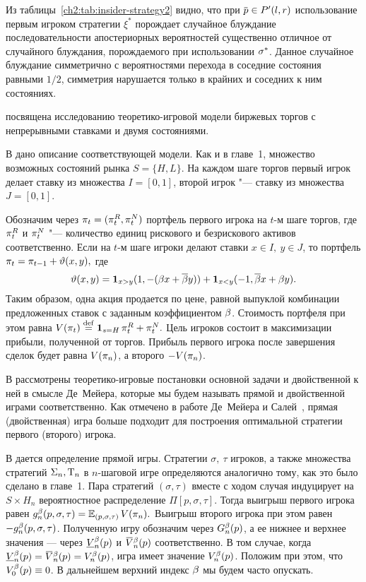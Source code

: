 Из таблицы~\ref{ch2:tab:insider-strategy2} видно, что при $\p \in P'(l, r)$ использование первым игроком стратегии $\xi^*$ порождает случайное блуждание последовательности апостериорных вероятностей существенно отличное от случайного блуждания, порождаемого при использовании $\sigma^*$.
Данное случайное блуждание симметрично с вероятностями перехода в соседние состояния равными $1/2$, симметрия нарушается только в крайних и соседних к ним состояниях.

 посвящена исследованию теоретико-игровой модели биржевых торгов с непрерывными ставками и двумя состояниями. 

В  дано описание соответствующей модели.
Как и в главе~1, множество возможных состояний рынка $S = \{H, L\}$.
На каждом шаге торгов первый игрок делает ставку из множества $I = [0, 1]$, второй игрок "--- ставку из множества $J = [0, 1]$.

Обозначим через $\pi_{t} = (\pi_{t}^R, \pi_{t}^N)$ портфель первого игрока на $t$-м шаге торгов, где $\pi_{t}^R$ и $\pi_{t}^N$ "--- количество единиц рискового и безрискового активов соответственно.
Если на $t$-м шаге игроки делают ставки $x \in I,\ y \in J$, то портфель 
$
\pi_{t} = \pi_{t-1} + \vartheta(x, y),
$
где
\begin{equation}\label{ch3:eq:trans-mech}
  \vartheta(x, y) = \mathbf{1}_{x > y} (1, -(\beta x + {{\overline{\beta}}} y)) +
  \mathbf{1}_{x < y} (-1, {{\overline{\beta}}} x + \beta y).
\end{equation}
Таким образом, одна акция продается по цене, равной выпуклой комбинации предложенных ставок с заданным коэффициентом $\beta$.
Стоимость портфеля при этом равна
$
  V(\pi_{t}) \overset{\mathrm{def}}{=} \mathbf{1}_{s = H} \, \pi_{t}^R + \pi_{t}^N.
$
Цель игроков состоит в максимизации прибыли, полученной от торгов.
Прибыль первого игрока после завершения сделок будет равна $V(\pi_{n})$, а второго $-V(\pi_{n})$.

В  рассмотрены теоретико-игровые постановки основной задачи и двойственной к ней в смысле Де~Мейера, которые мы будем называть прямой и двойственной играми соответственно.
Как отмечено в работе Де~Мейера и Салей~\cite{demeyer02}, прямая (двойственная) игра больше подходит для построения оптимальной стратегии первого (второго) игрока.

В  дается определение прямой игры.
Стратегии $\sigma,\ \tau$ игроков, а также множества стратегий $\Sigma_n, \mathrm{T}_n$ в $n$-шаговой игре определяются аналогично тому, как это было сделано в главе~1.
Пара стратегий $(\sigma, \tau)$ вместе с ходом случая индуцирует на $S \times H_n$ вероятностное распределение $\Pi[p, \sigma, \tau]$.
Тогда выигрыш первого игрока равен
$
  g^{\beta}_n(p, \sigma, \tau) = \operatorname{\mathbb{E}}_{( p, \sigma, \tau )} V(\pi_{n}).
$
Выигрыш второго игрока при этом равен $-g^{\beta}_n(p, \sigma, \tau)$.
Полученную игру обозначим через $G^{\beta}_n(p)$, а ее нижнее и верхнее значения --- через $\LV[\Co]{n}(p)$ и $\HV[\Co]{n}(p)$ соответственно.
В том случае, когда $\LV[\Co]{n}(p) = \HV[\Co]{n}(p) = V^\Co_n(p)$, игра имеет значение $V^{\beta}_n(p)$.
Положим при этом, что $V^{\beta}_0(p) \equiv 0$.
В дальнейшем верхний индекс $\beta$ мы будем часто опускать.

